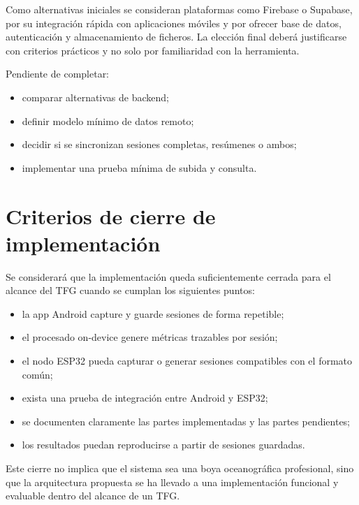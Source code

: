 Como alternativas iniciales se consideran plataformas como Firebase o Supabase, por su integración rápida con aplicaciones móviles y por ofrecer base de datos, autenticación y almacenamiento de ficheros. La elección final deberá justificarse con criterios prácticos y no solo por familiaridad con la herramienta.

\begin{temporalblock}
Pendiente de completar:
\begin{itemize}
  \item comparar alternativas de backend;
  \item definir modelo mínimo de datos remoto;
  \item decidir si se sincronizan sesiones completas, resúmenes o ambos;
  \item implementar una prueba mínima de subida y consulta.
\end{itemize}
\end{temporalblock}

\section{Criterios de cierre de implementación}

Se considerará que la implementación queda suficientemente cerrada para el alcance del TFG cuando se cumplan los siguientes puntos:

\begin{itemize}
  \item la app Android capture y guarde sesiones de forma repetible;
  \item el procesado on-device genere métricas trazables por sesión;
  \item el nodo ESP32 pueda capturar o generar sesiones compatibles con el formato común;
  \item exista una prueba de integración entre Android y ESP32;
  \item se documenten claramente las partes implementadas y las partes pendientes;
  \item los resultados puedan reproducirse a partir de sesiones guardadas.
\end{itemize}

Este cierre no implica que el sistema sea una boya oceanográfica profesional, sino que la arquitectura propuesta se ha llevado a una implementación funcional y evaluable dentro del alcance de un TFG.
